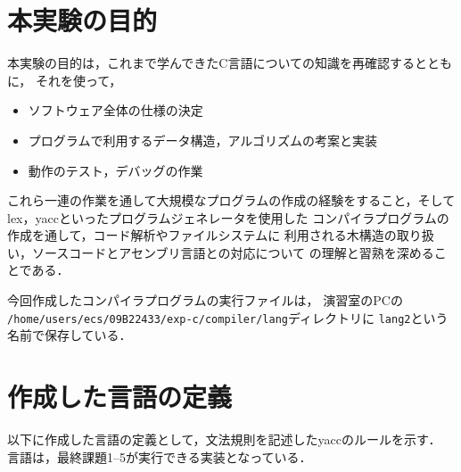 

\section{本実験の目的}
本実験の目的は，これまで学んできたC言語についての知識を再確認するとともに，
それを使って，
\begin{itemize}
  \item ソフトウェア全体の仕様の決定
  \item プログラムで利用するデータ構造，アルゴリズムの考案と実装
  \item 動作のテスト，デバッグの作業
\end{itemize}
これら一連の作業を通して大規模なプログラムの作成の経験をすること，そして
lex，yaccといったプログラムジェネレータを使用した
コンパイラプログラムの作成を通して，コード解析やファイルシステムに
利用される木構造の取り扱い，ソースコードとアセンブリ言語との対応について
の理解と習熟を深めることである．

今回作成したコンパイラプログラムの実行ファイルは，
演習室のPCの \\
\verb|/home/users/ecs/09B22433/exp-c/compiler/lang|ディレクトリに
\verb|lang2|という名前で保存している．

\section{作成した言語の定義}
以下に作成した言語の定義として，文法規則を記述したyaccのルールを示す．
言語は，最終課題1--5が実行できる実装となっている．

